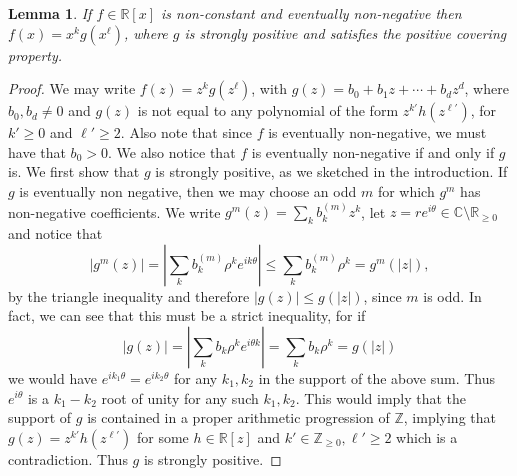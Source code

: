 \documentclass{daj}
\def\C{\mathbb{C}}
\newcommand{\R}{\mathbb{R}}
\def\Z{\mathbb{Z}}
\def\t{\theta}
\newtheorem{lemma}[theorem]{Lemma}
\theoremstyle{definition}
\theoremstyle{remark}
\begin{document}
\begin{lemma}\label{lem:easy-direction}
If $f \in \R[x]$ is non-constant and eventually non-negative then $f(x) = x^kg(x^{\ell})$, where $g$ is strongly positive and satisfies the positive covering property.
\end{lemma}
\begin{proof}We may write $f(z) = z^kg(z^{\ell})$, with $g(z) = b_0 + b_1z + \cdots +b_dz^d$, where $b_0,b_d \not=0$ and $g(z)$ is not equal to any polynomial of the form 
$z^{k'}h(z^{\ell'})$, for $k' \geq 0$ and $\ell'\geq 2$. Also note that since $f$ is eventually non-negative, we must have that $b_0 > 0$. We also notice that $f$ is eventually non-negative if and only if $g$ is. 
We first show that $g$ is strongly positive, as we sketched in the introduction. 
If $g$ is eventually non negative, then we may choose an odd $m$ for which $g^m$ has non-negative coefficients. We write $g^m(z) = \sum_{k}b^{(m)}_kz^k $, let $z = re^{i\t} \in \C \setminus \R_{\geq 0}$ and notice that 
\[ |g^m(z)| = \left| \sum_{k} b^{(m)}_k \rho^ke^{ik\t} \right| \leq \sum_{k} b^{(m)}_k \rho^k = g^m(|z|), \]
by the triangle inequality and therefore $|g(z)| \leq g(|z|)$, since $m$ is odd. In fact, we can see that this must be a strict inequality, for if 
\[ |g(z)| = \left| \sum_{k} b_k\rho^ke^{i\t k}  \right| =   \sum_{k} b_k\rho^k  = g(|z|)\] 
we would have $e^{ik_1\t} = e^{ik_2\t} $ for any $k_1,k_2$ in the support of the above sum. Thus $e^{i\t}$ is a $k_1-k_2$ root of unity for any such $k_1,k_2$. This would imply that the support of $g$ is contained in a proper arithmetic progression of $\Z$, implying that $g(z) = z^{k'}h(z^{\ell'})$ for some $h \in \R[z]$ and 
$k' \in \Z_{\geq 0}, \ell' \geq 2$ which is a contradiction. Thus $g$ is strongly positive.


\end{proof}
\end{document}
